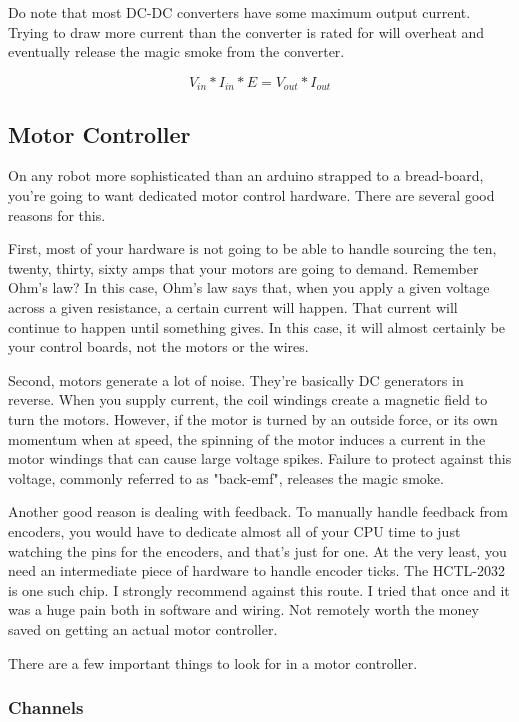 Do note that most DC-DC converters have some maximum output current. Trying to draw more current than the converter is rated for will overheat and eventually release the magic smoke from the converter.

\begin{equation}
V_{in}*I_{in}*E=V_{out}*I_{out}
\label{eqn:converterpower}
\end{equation}

\subsection{Motor Controller}

On any robot more sophisticated than an arduino strapped to a bread-board, you're going to want dedicated motor control hardware. There are several good reasons for this.

First, most of your hardware is not going to be able to handle sourcing the ten, twenty, thirty, sixty amps that your motors are going to demand. Remember Ohm's law? In this case, Ohm's law says that, when you apply a given voltage across a given resistance, a certain current will happen. That current will continue to happen until something gives. In this case, it will almost certainly be your control boards, not the motors or the wires.

Second, motors generate a lot of noise. They're basically DC generators in reverse. When you supply current, the coil windings create a magnetic field to turn the motors. However, if the motor is turned by an outside force, or its own momentum when at speed, the spinning of the motor induces a current in the motor windings that can cause large voltage spikes. Failure to protect against this voltage, commonly referred to as "back-emf", releases the magic smoke.

Another good reason is dealing with feedback. To manually handle feedback from encoders, you would have to dedicate almost all of your CPU time to just watching the pins for the encoders, and that's just for one. At the very least, you need an intermediate piece of hardware to handle encoder ticks. The HCTL-2032 is one such chip. I strongly recommend against this route. I tried that once and it was a huge pain both in software and wiring. Not remotely worth the money saved on getting an actual motor controller.

There are a few important things to look for in a motor controller.

\subsubsection{Channels}

